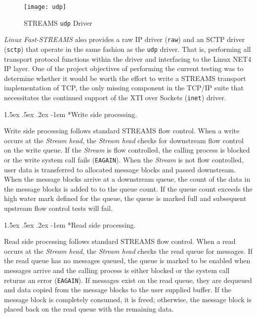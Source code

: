 \documentclass[letterpaper,final,notitlepage,twocolumn,10pt,twoside]{article}
\makeatletter
\renewcommand\paragraph{\@startsection{paragraph}{4}{\z@}%
                                    {1.5ex \@plus .5ex \@minus .2ex}%
                                    {-1em}%
                                    {\normalfont\normalsize\bfseries\slshape}}
\makeatother
\begin{document}
\begin{figure}[htp]
\center\texttt{[image: udp]}
\caption[STREAMS \texttt{udp} Driver]{STREAMS \texttt{udp} Driver}
\label{figure:udp}
\end{figure}

\textsl{Linux Fast-STREAMS} also provides a raw IP driver (\texttt{raw}) and
an SCTP driver (\texttt{sctp}) that operate in the same fashion as the
\texttt{udp} driver.  That is, performing all transport protocol functions
within the driver and interfacing to the Linux NET4 IP layer.  One of the
project objectives of performing the current testing was to determine whether
it would be worth the effort to write a STREAMS transport implementation of
TCP, the only missing component in the TCP/IP suite that necessitates the
continued support of the XTI over Sockets (\texttt{inet}) driver.

\paragraph*{Write side processing.}

Write side processing follows standard STREAMS flow control.  When a write
occurs at the \textit{Stream head}, the \textit{Stream head} checks for
downstream flow control on the write queue.  If the \textit{Stream} is flow
controlled, the calling process is blocked or the write system call fails
(\texttt{EAGAIN}).  When the \textit{Stream} is not flow controlled, user data
is transferred to allocated message blocks and passed downstream.  When the
message blocks arrive at a downstream queue, the count of the data in the
message blocks is added to to the queue count.  If the queue count exceeds the
high water mark defined for the queue, the queue is marked full and subsequent
upstream flow control tests will fail.

\paragraph*{Read side processing.}

Read side processing follows standard STREAMS flow control.  When a read
occurs at the \textit{Stream head}, the \textit{Stream head} checks the read
queue for messages.  If the read queue has no messages queued, the queue is
marked to be enabled when messages arrive and the calling process is either
blocked or the system call returns an error (\texttt{EAGAIN}).  If messages
exist on the read queue, they are dequeued and data copied from the message
blocks to the user supplied buffer.  If the message block is completely
consumed, it is freed; otherwise, the message block is placed back on the read
queue with the remaining data.
\end{document}
